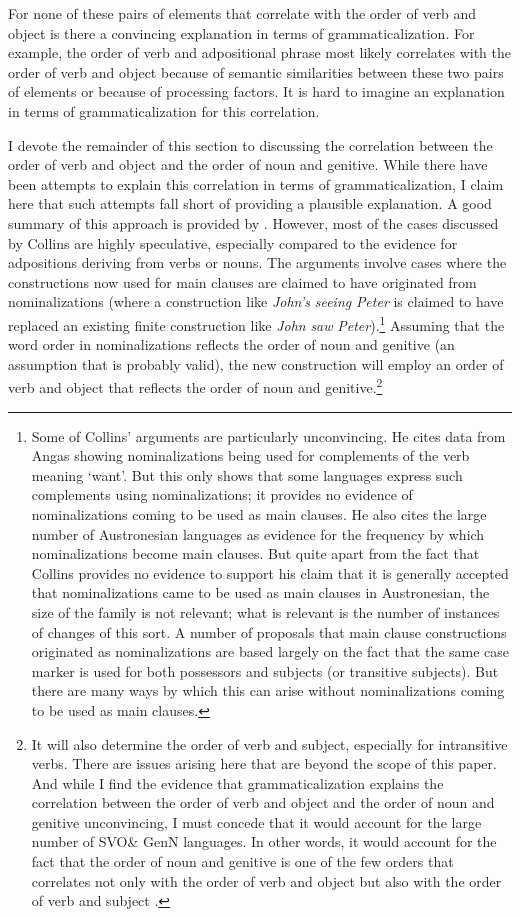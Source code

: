 \documentclass[output=paper]{langsci/langscibook}
\begin{document}
For none of these pairs of elements that correlate with the order of verb and object is there a convincing explanation in terms of grammaticalization. For example, the order of verb and adpositional phrase most likely correlates with the order of verb and object because of semantic similarities between these two pairs of elements or because of processing factors. It is hard to imagine an explanation in terms of grammaticalization for this correlation.

I devote the remainder of this section to discussing the correlation between the order of verb and object and the order of noun and genitive. While there have been attempts to explain this correlation in terms of grammaticalization, I claim here that such attempts fall short of providing a plausible explanation. A good summary of this approach is provided by . However, most of the cases discussed by Collins are highly speculative, especially compared to the evidence for adpositions deriving from verbs or nouns. The arguments involve cases where the constructions now used for main clauses are claimed to have originated from nominalizations (where a construction like \textit{John’s} \textit{seeing} \textit{Peter} is claimed to have replaced an existing finite construction like \textit{John} \textit{saw} \textit{Peter}).\footnote{Some of Collins’ arguments are particularly unconvincing. He cites data from Angas showing nominalizations being used for complements of the verb meaning ‘want’. But this only shows that some languages express such complements using nominalizations; it provides no evidence of nominalizations coming to be used as main clauses. He also cites the large number of Austronesian languages as evidence for the frequency by which nominalizations become main clauses. But quite apart from the fact that Collins provides no evidence to support his claim that it is generally accepted that nominalizations came to be used as main clauses in Austronesian, the size of the family is not relevant; what is relevant is the number of instances of changes of this sort. A number of proposals that main clause constructions originated as nominalizations are based largely on the fact that the same case marker is used for both possessors and subjects (or transitive subjects). But there are many ways by which this can arise without nominalizations coming to be used as main clauses.} Assuming that the word order in nominalizations reflects the order of noun and genitive (an assumption that is probably valid), the new construction will employ an order of verb and object that reflects the order of noun and genitive.\footnote{It will also determine the order of verb and subject, especially for intransitive verbs. There are issues arising here that are beyond the scope of this paper. And while I find the evidence that grammaticalization explains the correlation between the order of verb and object and the order of noun and genitive unconvincing, I must concede that it would account for the large number of SVO\& GenN languages. In other words, it would account for the fact that the order of noun and genitive is one of the few orders that correlates not only with the order of verb and object but also with the order of verb and subject \citep{Dryer2013_Six2}.}
\end{document}
